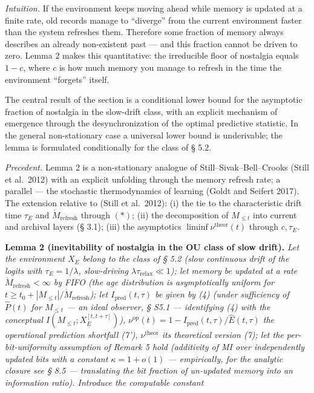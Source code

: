 \documentclass[pdflatex,sn-mathphys-ay]{sn-jnl}
\providecommand{\lt}{<}\providecommand{\gt}{>}
\begin{document}
\emph{Intuition.} If the environment keeps moving ahead while memory is updated at a finite rate, old records manage to ``diverge'' from the current environment faster than the system refreshes them. Therefore some fraction of memory always describes an already non-existent past --- and this fraction cannot be driven to zero. Lemma 2 makes this quantitative: the irreducible floor of nostalgia equals \(1-c\), where \(c\) is how much memory you manage to refresh in the time the environment ``forgets'' itself.



The central result of the section is a conditional lower bound for the asymptotic fraction of nostalgia in the slow-drift class, with an explicit mechanism of emergence through the desynchronization of the optimal predictive statistic. In the general non-stationary case a universal lower bound is underivable; the lemma is formulated conditionally for the class of § 5.2.



\emph{Precedent.} Lemma 2 is a non-stationary analogue of Still--Sivak--Bell--Crooks (Still et al.~2012) with an explicit unfolding through the memory refresh rate; a parallel --- the stochastic thermodynamics of learning (Goldt and Seifert 2017). The extension relative to (Still et al.~2012): (i) the tie to the characteristic drift time \(\tau_E\) and \(\dot{M}_{\text{refresh}}\) through \((*)\); (ii) the decomposition of \(M_{\le t}\) into current and archival layers (§ 3.1); (iii) the asymptotics \(\liminf \nu^{\text{theor}}(t)\) through \(c, \tau_E\).



\textbf{Lemma 2 (inevitability of nostalgia in the OU class of slow drift).} \emph{Let the environment \(X_E\) belong to the class of § 5.2 (slow continuous drift of the logits with \(\tau_E = 1/\lambda\), slow-driving \(\lambda \tau_{\text{relax}} \ll 1\)); let memory be updated at a rate \(\dot{M}_{\text{refresh}} \lt \infty\) by FIFO (the age distribution is asymptotically uniform for \(t \ge t_0 + |M_{\le t}|/\dot{M}_{\text{refresh}}\)); let \(I_{\text{pred}}(t,\tau)\) be given by (4) (under sufficiency of \(\hat P(t)\) for \(M_{\le t}\) --- an ideal observer, § S5.1 --- identifying (4) with the conceptual \(I(M_{\le t}; X_E^{[t,t+\tau]})\)), \(\nu^{\text{op}}(t) = 1 - I_{\text{pred}}(t,\tau)/\hat E(t,\tau)\) the operational prediction shortfall (7'), \(\nu^{\text{theor}}\) its theoretical version (7); let the per-bit-uniformity assumption of Remark 5 hold (additivity of MI over independently updated bits with a constant \(\kappa = 1+o(1)\) --- empirically, for the analytic closure see § 8.5 --- translating the bit fraction of un-updated memory into an information ratio). Introduce the computable constant}
\end{document}
